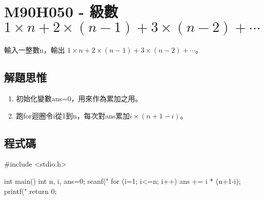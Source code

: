 \section{M90H050 - 級數 $ 1\times n+2\times (n-1)+3\times (n-2)+\cdots$}
輸入一整數n，輸出 $1\times n+2\times (n-1)+3\times (n-2)+\cdots$。
\subsection{解題思惟}
\begin{enumerate}
	\item 初始化變數ans=0，用來作為累加之用。
	\item 跑for迴圈令i從1到n，每次對ans累加$i\times(n+1-i)$。
\end{enumerate}
\subsection{程式碼}
\begin{cppcode}
#include <stdio.h>

int main()
{
	int n, i, ans=0;
	scanf("%
	for (i=1; i<=n; i++) {
		ans += i * (n+1-i);
	}
	printf("%
	return 0;
}
\end{cppcode}
